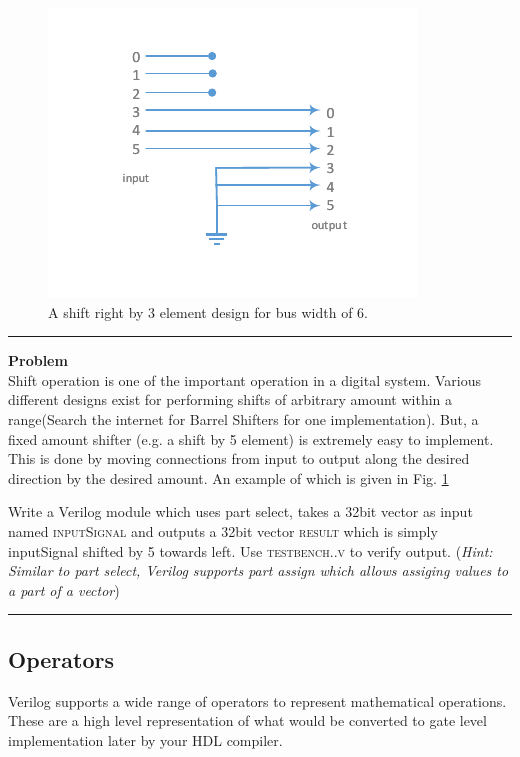 \documentclass[a4paper,10pt]{article}
\newcommand{\ano}{\text{1}}
\theoremstyle{mytheor}
\newcounter{problemNumber}
\newcommand {
  \insertProblem}[1]{
  \vspace{0.5cm}
  \hrule
  \vspace{0.3cm}

  {\color{greatblue}\textbf{\large{Problem \theproblemNumber}}}
  \vspace{2pt}\\#1

  \addtocounter{problemNumber}{1}
  \vspace{0.2cm}
  \hrule  
  \vspace{0.5cm}
}
\begin{document}
\begin{figure}[!h] \centering  
  \includegraphics[width=0.45\linewidth]{./resources/shiftUsingWires_representation.pdf}
  \caption{A shift right by 3 element design for bus width of 6.} 
  \label{Fig:shiftUsingWires-representation}
\end{figure}
\insertProblem{ Shift operation is one of the important operation in a digital system. Various different designs exist for performing shifts of arbitrary amount within a range(Search the internet for Barrel Shifters for one implementation). But, a fixed amount shifter (e.g. a shift by 5 element) is extremely easy to implement. This is done by moving connections from input to output along the desired direction by the desired amount. An example of which is given in Fig. \ref{Fig:shiftUsingWires-representation} 

  Write a Verilog module which uses part select, takes a 32bit vector as input named \textsc{inputSignal} and outputs a 32bit vector \textsc{result} which is simply inputSignal shifted by 5 towards left. Use \textsc{testbench{\ano}.{\theproblemNumber}.v} to verify output. (\textit{Hint: Similar to part select, Verilog supports part assign which allows assiging values to a part of a vector})}
%

\subsection*{Operators}
Verilog supports a wide range of operators to represent mathematical operations. These are a high level representation of what would be converted to gate level implementation later by your HDL compiler.
\end{document}
